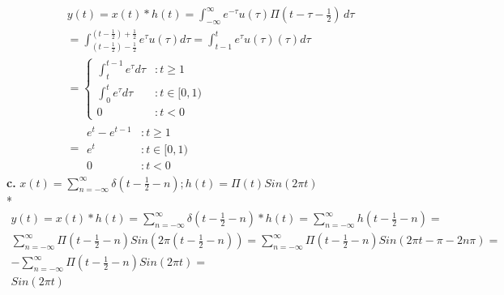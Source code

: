 \documentclass[10pt, letterpaper]{article}
\begin{document}
\begin{align*}
	y(t) = x(t) * h(t) = \int_{-\infty}^{\infty} e^{-\tau}u(\tau) \Pi (t - \tau - \frac{1}{2}) \, d\tau \\
	= \int_{(t - \frac{1}{2}) - \frac{1}{2}}^{(t - \frac{1}{2}) + \frac{1}{2}}e^\tau u(\tau) d\tau
	= \int_{t - 1}^{t}e^\tau u(\tau)(\tau) d\tau \\
           = \left\{
  		\begin{array}{lr}
		    \int_{t}^{t - 1}e^\tau  d\tau & : t\geq 1 \\
		    \int_{0}^{t}e^\tau d\tau & : t \in [0, 1)\\
	              0 & : t < 0
		  \end{array}
	\right. \\	
	=
	\boxed{
	\begin{array}{lr}
		    e^t - e^{t - 1} & : t\geq 1 \\
		    e^t & : t \in [0, 1)\\
	              0 & : t < 0
	 \end{array}
	}
\end{align*}
\textbf{c.}
$x(t) = \sum_{n = -\infty}^{\infty} \delta(t - \frac{1}{2} - n) ; h(t) = \Pi(t)Sin(2\pi t)$\\*
\begin{align*}
	y(t) = x(t) * h(t) = \sum_{n = -\infty}^{\infty} \delta(t - \frac{1}{2} - n) * h(t)	= 
	\sum_{n = -\infty}^{\infty}h(t - \frac{1}{2} - n) = \\
	\sum_{n = -\infty}^{\infty} \Pi(t - \frac{1}{2} - n)Sin(2\pi (t - \frac{1}{2} - n)) = 
	\sum_{n = -\infty}^{\infty} \Pi(t - \frac{1}{2} - n)Sin(2\pi t - \pi - 2 n \pi ) = \\
	-\sum_{n = -\infty}^{\infty} \Pi(t - \frac{1}{2} - n)Sin(2\pi t) = \\
	\boxed{Sin(2\pi t)}
\end{align*}
\end{document}
